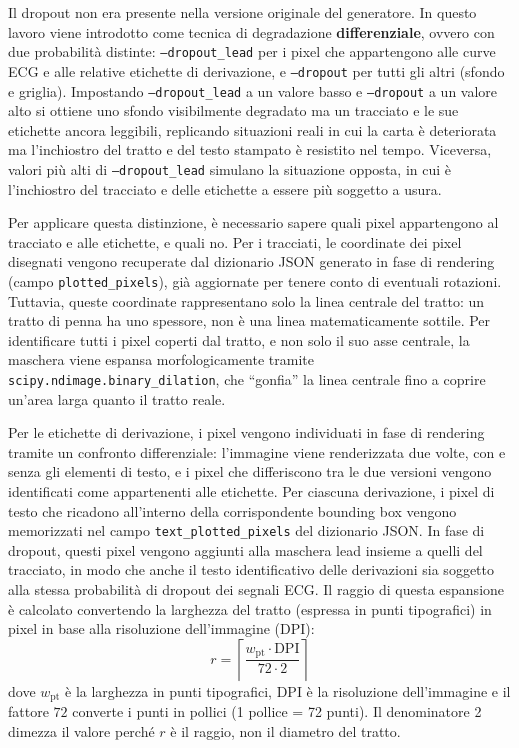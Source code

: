 Il dropout non era presente nella versione originale del generatore. In questo lavoro viene introdotto come tecnica di degradazione \textbf{differenziale}, ovvero con due probabilità distinte: \texttt{--dropout\_lead} per i pixel che appartengono alle curve ECG e alle relative etichette di derivazione, e \texttt{--dropout} per tutti gli altri (sfondo e griglia). Impostando \texttt{--dropout\_lead} a un valore basso e \texttt{--dropout} a un valore alto si ottiene uno sfondo visibilmente degradato ma un tracciato e le sue etichette ancora leggibili, replicando situazioni reali in cui la carta è deteriorata ma l'inchiostro del tratto e del testo stampato è resistito nel tempo. Viceversa, valori più alti di \texttt{--dropout\_lead} simulano la situazione opposta, in cui è l'inchiostro del tracciato e delle etichette a essere più soggetto a usura.

Per applicare questa distinzione, è necessario sapere quali pixel appartengono al tracciato e alle etichette, e quali no. Per i tracciati, le coordinate dei pixel disegnati vengono recuperate dal dizionario JSON generato in fase di rendering (campo \texttt{plotted\_pixels}), già aggiornate per tenere conto di eventuali rotazioni. Tuttavia, queste coordinate rappresentano solo la linea centrale del tratto: un tratto di penna ha uno spessore, non è una linea matematicamente sottile. Per identificare tutti i pixel coperti dal tratto, e non solo il suo asse centrale, la maschera viene espansa morfologicamente tramite \texttt{scipy.ndimage.binary\_dilation}, che ``gonfia'' la linea centrale fino a coprire un'area larga quanto il tratto reale.

Per le etichette di derivazione, i pixel vengono individuati in fase di rendering tramite un confronto differenziale: l'immagine viene renderizzata due volte, con e senza gli elementi di testo, e i pixel che differiscono tra le due versioni vengono identificati come appartenenti alle etichette. Per ciascuna derivazione, i pixel di testo che ricadono all'interno della corrispondente bounding box vengono memorizzati nel campo \texttt{text\_plotted\_pixels} del dizionario JSON. In fase di dropout, questi pixel vengono aggiunti alla maschera lead insieme a quelli del tracciato, in modo che anche il testo identificativo delle derivazioni sia soggetto alla stessa probabilità di dropout dei segnali ECG. Il raggio di questa espansione è calcolato convertendo la larghezza del tratto (espressa in punti tipografici) in pixel in base alla risoluzione dell'immagine (DPI):
\[
r = \left\lceil \frac{w_{\text{pt}} \cdot \text{DPI}}{72 \cdot 2} \right\rceil
\]
dove $w_{\text{pt}}$ è la larghezza in punti tipografici, DPI è la risoluzione dell'immagine e il fattore $72$ converte i punti in pollici (1 pollice = 72 punti). Il denominatore 2 dimezza il valore perché $r$ è il raggio, non il diametro del tratto.

